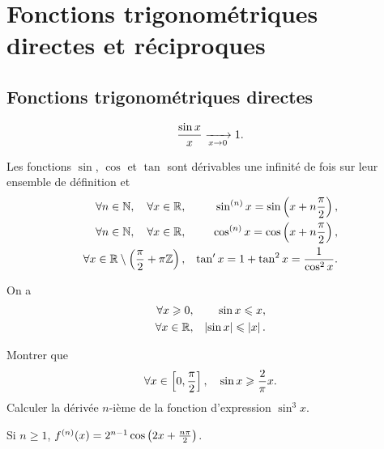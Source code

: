 \documentclass{magnolia}
\begin{document}
\section{Fonctions trigonométriques directes et réciproques}
\subsection{Fonctions trigonométriques directes}

\begin{proposition}
  \[\frac{\sin x}{x}\xrightarrow[x\rightarrow 0]{}1.\]
\end{proposition}

\begin{proposition}[utile=-3]
Les fonctions $\sin$, $\cos$ et $\tan$ sont dérivables une infinité de fois sur leur ensemble
de définition et
\begin{eqnarray*}
\forall n\in\mathbb{N} ,\quad \forall x\in\mathbb{R}, & &
  \sin^{(n)} x=\sin\left(x+n\frac{\pi}{2}\right),\\
\forall n\in\mathbb{N} ,\quad \forall x\in\mathbb{R}, & &
  \cos^{(n)} x=\cos\left(x+n\frac{\pi}{2}\right),\\
\forall x\in\mathbb{R}\setminus\left(\frac{\pi}{2}+\pi\mathbb{Z}\right), & &
  \tan' x=1+\tan^2 x=\frac{1}{\cos^2 x}.
\end{eqnarray*}
\end{proposition}

\begin{proposition}
On a
\begin{eqnarray*}
\forall x\geqslant 0,& & \sin x\leqslant x,\\
\forall x\in\mathbb{R},& & \left|\sin x\right|\leqslant \left|x\right|.
\end{eqnarray*}
\end{proposition}

\begin{exos}
\exemple Montrer que
  \[\forall x\in\left[0,\frac{\pi}{2}\right] ,\quad
    \sin x \geqslant \frac{2}{\pi}x.\]
\exemple Calculer la dérivée $n$-ième de la fonction d'expression $\sin^3 x$.
  \begin{sol}
  Si $n\geq 1$, $f^{(n)}(x)=2^{n-1}\cos\left(2x+\frac{n\pi}{2}\right)$.
  \end{sol}
\end{exos}

\end{document}
